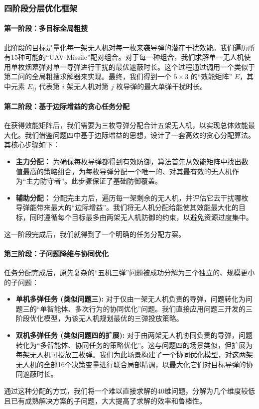 \documentclass[12pt]{article}
\begin{document}
\begin{CJK}{UTF8}{gbsn}
		\subsubsection{四阶段分层优化框架}
		
		\paragraph{第一阶段：多目标全局粗搜}
		此阶段的目标是量化每一架无人机对每一枚来袭导弹的潜在干扰效能。我们遍历所有15种可能的“UAV-Missile”配对组合。对于每一种组合，我们求解单一无人机使用单枚烟幕弹对单一导弹进行干扰的最优遮蔽时长。这个过程通过调用一个类似于第二问的全局粗搜求解器来实现。最终，我们得到一个 $5 \times 3$ 的“效能矩阵” $E$，其中元素 $E_{ij}$ 代表第 $i$ 架无人机对第 $j$ 枚导弹的最大单弹干扰时长。
		
		\paragraph{第二阶段：基于边际增益的贪心任务分配}
		在获得效能矩阵后，我们需要为三枚导弹分配合计五架无人机，以实现总体效能最大化。我们借鉴问题四中基于边际增益的思想，设计了一套高效的贪心分配算法。其核心步骤如下：
		
		\begin{itemize}
			\item \textbf{主力分配：} 为确保每枚导弹都得到有效防御，算法首先从效能矩阵中找出数值最高的策略组合，为每枚导弹分配一个唯一的、对其最有效的无人机作为“主力防守者”。此步骤保证了基础防御覆盖。
			\item \textbf{辅助分配：} 分配完主力后，遍历每一架剩余的无人机，并评估它去干扰哪枚导弹能带来最大的“边际增益”。我们将无人机分配给能使其效能最大化的目标，同时遵循每个目标最多由两架无人机防御的约束，以避免资源过度集中。
		\end{itemize}
		这一阶段完成后，我们就得到了一个明确的任务分配方案。
		
		\paragraph{第三阶段：子问题降维与协同优化}
		任务分配完成后，原先复杂的“五机三弹”问题被成功分解为三个独立的、规模更小的子问题：
		\begin{itemize}
			\item \textbf{单机多弹任务 (类似问题三):} 对于仅由一架无人机负责的导弹，问题转化为问题三的“单智能体、多次行为的协同优化”问题。我们直接应用问题三开发的三阶段优化模型，为该无人机规划最优的三弹投放策略。
			\item \textbf{双机多弹任务 (类似问题四的扩展):} 对于由两架无人机协同负责的导弹，问题转化为“多智能体、协同任务的策略优化”。这与问题四的场景类似，但扩展为每架无人机可投放三枚弹。我们为此场景构建了一个协同优化模型，对这两架无人机的全部16个决策变量进行联合局部精调，以最大化它们对目标导弹的协同遮蔽时长。
		\end{itemize}
		通过这种分配的方式，我们将一个难以直接求解的40维问题，分解为几个维度较低且已有成熟解决方案的子问题，大大提高了求解的效率和鲁棒性。
		

\end{CJK}
\end{document}
